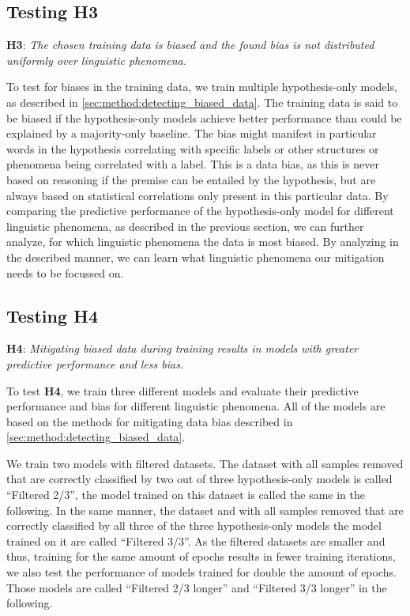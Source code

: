 \subsection{Testing H3}
\textbf{H3}: \textit{The chosen training data is biased and the found bias is not distributed uniformly over linguistic phenomena.}

To test for biases in the training data, we train multiple hypothesis-only models, as described in \autoref{sec:method:detecting_biased_data}. The training data is said to be biased if the hypothesis-only models achieve better performance than could be explained by a majority-only baseline. The bias might manifest in particular words in the hypothesis correlating with specific labels or other structures or phenomena being correlated with a label. This is a data bias, as this is never based on reasoning if the premise can be entailed by the hypothesis, but are always based on statistical correlations only present in this particular data. By comparing the predictive performance of the hypothesis-only model for different linguistic phenomena, as described in the previous section, we can further analyze, for which linguistic phenomena the data is most biased. By analyzing in the described manner, we can learn what linguistic phenomena our mitigation needs to be focussed on.

\subsection{Testing H4} \label{sub:experiments-h4}
\textbf{H4}: \textit{Mitigating biased data during training results in models with greater predictive performance and less bias.}

To test \textbf{H4}, we train three different models and evaluate their predictive performance and bias for different linguistic phenomena. All of the models are based on the methods for mitigating data bias described in \autoref{sec:method:detecting_biased_data}. 

We train two models with filtered datasets. The dataset with all samples removed that are correctly classified by two out of three hypothesis-only models is called \enquote{Filtered 2/3}, the model trained on this dataset is called the same in the following. In the same manner, the dataset and with all samples removed that are correctly classified by all three of the three hypothesis-only models the model trained on it are called \enquote{Filtered 3/3}. As the filtered datasets are smaller and thus, training for the same amount of epochs results in fewer training iterations, we also test the performance of models trained for double the amount of epochs. Those models are called \enquote{Filtered 2/3 longer} and \enquote{Filtered 3/3 longer} in the following.

